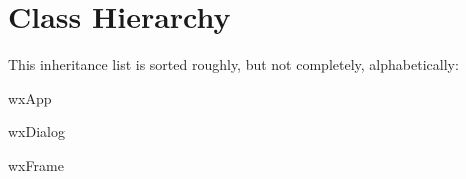 \section{Class Hierarchy}
This inheritance list is sorted roughly, but not completely, alphabetically\-:\begin{DoxyCompactList}
\item {}
\item {}
\item wx\-App\begin{DoxyCompactList}
\item {}
\end{DoxyCompactList}
\item wx\-Dialog\begin{DoxyCompactList}
\item {}
\end{DoxyCompactList}
\item wx\-Frame\begin{DoxyCompactList}
\item {}
\end{DoxyCompactList}
\end{DoxyCompactList}
